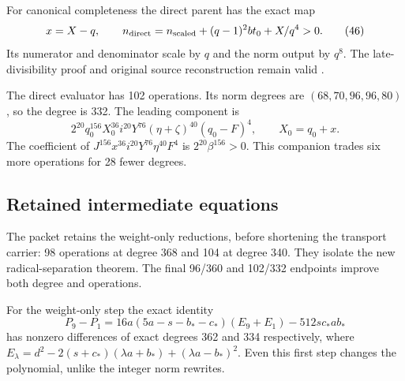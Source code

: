 For canonical completeness the direct parent has the exact map
\[
x=X-q,\qquad
n_{\rm direct}=n_{\rm scaled}+(q-1)^2bt_0+X/q^4>0.
\tag{46}
\]
Its numerator and denominator scale by $q$ and the norm output by $q^8$.
The late-divisibility proof and original source reconstruction remain valid
\cite{direct}.

The direct evaluator has 102 operations.
Its norm degrees are $(68,70,96,96,80)$, so the degree is 332.
The leading component is
\[
2^{20}q_0^{156}X_0^{36}i^{20}Y^{76}
(\eta+\zeta)^{40}(q_0-F)^4,\qquad X_0=q_0+x.
\tag{47}
\]
The coefficient of $J^{156}x^{36}i^{20}Y^{76}\eta^{40}F^4$ is
$2^{20}\beta^{156}>0$.
This companion trades six more operations for 28 fewer degrees.

\subsection{Retained intermediate equations}

The packet retains the weight-only reductions, before shortening the
transport carrier: 98 operations at degree 368 and 104 at degree 340.
They isolate the new radical-separation theorem.
The final 96/360 and 102/332 endpoints improve both degree and operations.

For the weight-only step the exact identity
\[
P_9-P_1
=16a(5a-s-b_*-c_*)(E_9+E_1)-512sc_*ab_*
\tag{48}
\]
has nonzero differences of exact degrees 362 and 334 respectively,
where $E_\lambda=d^2-2(s+c_*)(\lambda a+b_*)+(\lambda a-b_*)^2$.
Even this first step changes the polynomial, unlike the integer norm
rewrites.

